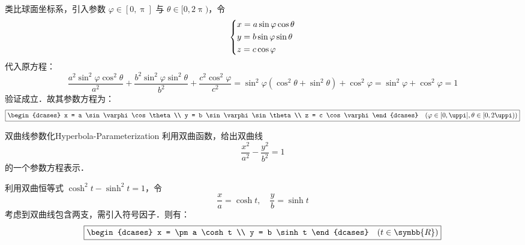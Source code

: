 \begin{solution}
    类比球面坐标系，引入参数 $\varphi \in [0, \uppi]$ 与 $\theta \in [0, 2\uppi)$，令
    \begin{equation}
        \begin{dcases}
            x = a \sin \varphi \cos \theta \\
            y = b \sin \varphi \sin \theta \\
            z = c \cos \varphi
        \end{dcases}
    \end{equation}
    代入原方程：
    \begin{equation}
        \frac{a^2 \sin^2 \varphi \cos^2 \theta}{a^2} + \frac{b^2 \sin^2 \varphi \sin^2 \theta}{b^2} + \frac{c^2 \cos^2 \varphi}{c^2} = \sin^2 \varphi (\cos^2 \theta + \sin^2 \theta) + \cos^2 \varphi = \sin^2 \varphi + \cos^2 \varphi = 1
    \end{equation}
    验证成立．故其参数方程为：
    \begin{equation}
        \boxed{\begin{dcases} x = a \sin \varphi \cos \theta \\ y = b \sin \varphi \sin \theta \\ z = c \cos \varphi \end{dcases} \quad (\varphi \in [0, \uppi], \theta \in [0, 2\uppi))}
    \end{equation}
\end{solution}

\begin{problem}{双曲线参数化}{Hyperbola-Parameterization}
    利用双曲函数，给出双曲线
    \begin{equation}
        \frac{x^2}{a^2} - \frac{y^2}{b^2} = 1
    \end{equation}
    的一个参数方程表示．
\end{problem}

\begin{solution}
    利用双曲恒等式 $\cosh^2 t - \sinh^2 t = 1$，令
    \begin{equation}
        \frac{x}{a} = \cosh t, \quad \frac{y}{b} = \sinh t
    \end{equation}
    考虑到双曲线包含两支，需引入符号因子．则有：
    \begin{equation}
        \boxed{\begin{dcases} x = \pm a \cosh t \\ y = b \sinh t \end{dcases} \quad (t \in \symbb{R})}
    \end{equation}
\end{solution}

